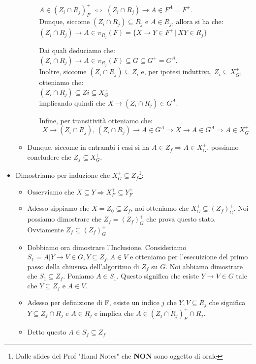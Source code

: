 \documentclass{article}
\begin{document}
\begin{itemize}
\begin{itemize}
\begin{itemize}
      $A \in (Z_i \cap R_j)^+_F$ $\Leftrightarrow$ $(Z_i \cap R_j) \rightarrow A \in F^A = F^+$. \\
      
      Dunque, siccome $(Z_i \cap R_j) \subseteq R_j$ e $A \in R_j$, allora si ha che:\\

        $(Z_i \cap R_j) \rightarrow A \in \pi_{R_j}(F) = \{X \rightarrow Y \in F^+ \,|\, XY \in R_j\}$
      
      
    Dai quali deduciamo che:\\

    $(Z_i \cap R_j) \rightarrow A \in \pi_{R_j}(F) \subseteq G \subseteq G^+ = G^A$.\\

    Inoltre, siccome $(Z_i \cap R_j) \subseteq Z_i$ e, per ipotesi induttiva, $Z_i \subseteq X_G^+$, otteniamo che:\\ 
    
    $(Z_i \cap R_j) \subseteq Zi \subseteq X_G^+$ \\
    
    implicando quindi che $X \rightarrow (Z_i \cap R_j) \in G^A$.

    Infine, per transitività otteniamo che:
    \[ X \rightarrow (Z_i \cap R_j), \, (Z_i \cap R_j) \rightarrow A \in G^A \Rightarrow X \rightarrow A \in G^A \Rightarrow A \in X_G^+ \]
    \end{itemize}  
    \item Dunque, siccome in entrambi i casi si ha $A \in Z_f \Rightarrow A \in X_G^+$, possiamo concludere che $Z_f \subseteq X_G^+$.

  \end{itemize}
  \item Dimostriamo per induzione che $X_G^+ \subseteq Z_f$\footnote{Dalle slides del Prof "Hand Notes" che \textbf{NON} sono oggetto di orale}:
  \begin{itemize}
    \item Osserviamo che $X \subseteq Y \Rightarrow X_F^+ \subseteq Y^+_F$
    \item Adesso sippiamo che $X = Z_0 \subseteq Z_f$, noi otteniamo che $X_G^+ \subseteq (Z_f)^+_G$. Noi possiamo dimostrare che $Z_f = (Z_f)^+_G$ che prova questo stato. Ovviamente $Z_f \subseteq (Z_f)^+_G$
    \item Dobbiamo ora dimostrare l'Inclusione. Consideriamo $S_1 = { A | Y \rightarrow V \in G, Y \subseteq Z_f, A \in V }$ e otteniamo per l'esecuizione del primo passo della chiususa dell'algoritmo di $Z_f$ su $G$. Noi abbiamo dimostrare che $S_1 \subseteq Z_f$. Poniamo $A \in S_1$. Questo significa che esiste $Y \rightarrow V \in G$ tale che $Y \subseteq Z_f$ e $A \in V$.
    \item Adesso per definizione di F, esiste un indice $j$ che $Y, V \subseteq R_j$ che significa $Y \subseteq Z_f \cap R_j$ e $A \in R_j$ e implica che $A \in (Z_j \cap R_j)^+_F \cap R_j$.
    \item Detto questo $A \in S_f \subseteq Z_f$ 
  \end{itemize}
\end{itemize}
\end{document}
